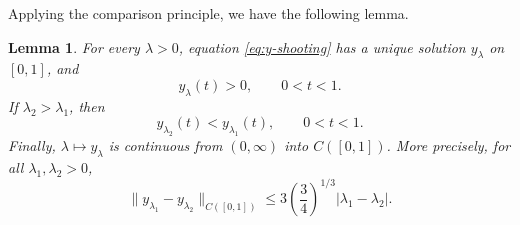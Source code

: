 \documentclass[12pt,preprint]{amsart}
\numberwithin{equation}{section}
\theoremstyle{plain}
\newtheorem{lemma}[theorem]{Lemma}
\theoremstyle{definition}
\begin{document}
Applying the comparison principle, we have the following lemma.

\begin{lemma}
\label{lem:shooting-properties}
For every \(\lambda>0\), equation \eqref{eq:y-shooting} has a unique solution
\(y_\lambda\) on \([0,1]\), and
\begin{equation}
    \label{eq:y>0}
y_\lambda(t)>0,\qquad 0<t<1.
\end{equation}
  If
\(\lambda_2>\lambda_1\), then
\begin{equation}
 y_{\lambda_2}(t)<y_{\lambda_1}(t),
 \qquad 0<t<1.
 \label{eq:shooting-strict-order}
\end{equation}
Finally, \(\lambda\mapsto y_\lambda\) is continuous from \((0,\infty)\) into \(C([0,1])\).
More precisely, for all \(\lambda_1,\lambda_2>0\),
\[
 \|y_{\lambda_1}-y_{\lambda_2}\|_{C([0,1])}
 \le 3\left(\frac34\right)^{1/3}|\lambda_1-\lambda_2|.
\]
\end{lemma}
\end{document}
